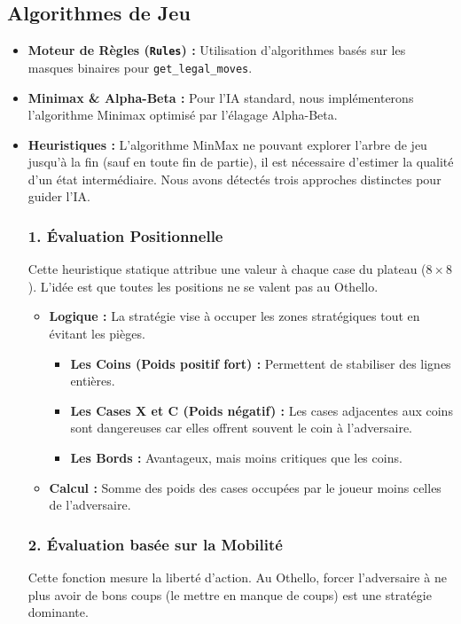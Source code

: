 \documentclass[a4paper]{article}
\begin{document}
\subsection{Algorithmes de Jeu}
\begin{itemize}
    \item \textbf{Moteur de Règles (\texttt{Rules}) :} Utilisation d'algorithmes basés sur les masques binaires pour \texttt{get\_legal\_moves}.    
        \item \textbf{Minimax \& Alpha-Beta :} Pour l'IA standard, nous implémenterons l'algorithme Minimax optimisé par l'élagage Alpha-Beta.
        \item \textbf{Heuristiques :} L'algorithme MinMax ne pouvant explorer l'arbre de jeu jusqu'à la fin (sauf en toute fin de partie), il est nécessaire d'estimer la qualité d'un état intermédiaire. Nous avons détectés trois approches distinctes pour guider l'IA.

\subsubsection{1. Évaluation Positionnelle}
Cette heuristique statique attribue une valeur à chaque case du plateau ($8 \times 8$). L'idée est que toutes les positions ne se valent pas au Othello.

\begin{itemize}
    \item \textbf{Logique :} La stratégie vise à occuper les zones stratégiques tout en évitant les pièges.
    \begin{itemize}
        \item \textbf{Les Coins (Poids positif fort) :} Permettent de stabiliser des lignes entières.
        \item \textbf{Les Cases X et C (Poids négatif) :} Les cases adjacentes aux coins sont dangereuses car elles offrent souvent le coin à l'adversaire.
        \item \textbf{Les Bords :} Avantageux, mais moins critiques que les coins.
    \end{itemize}
    \item \textbf{Calcul :} Somme des poids des cases occupées par le joueur moins celles de l'adversaire.
\end{itemize}

\subsubsection{2. Évaluation basée sur la Mobilité}
Cette fonction mesure la liberté d'action. Au Othello, forcer l'adversaire à ne plus avoir de bons coups (le mettre en manque de coups) est une stratégie dominante.


\end{itemize}
\end{document}
